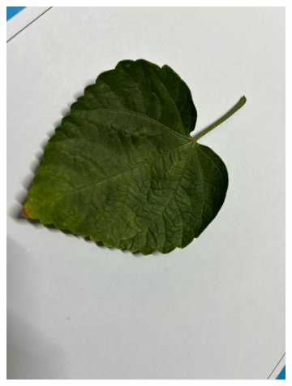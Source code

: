 \documentclass[twocolumn]{article}
\begin{document}
\begin{figure}[H]
    \centering
    \begin{subfigure}[b]{0.30\columnwidth}
        \includegraphics[width=\textwidth]{rosa1}
    \end{subfigure}
    \hfill
    \begin{subfigure}[b]{0.30\columnwidth}

\end{subfigure}
\end{figure}
\end{document}

